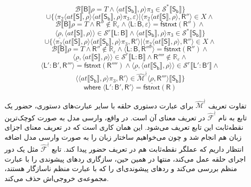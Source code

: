 $$\mathcal{B}\llbracket \mathsf{B} \rrbracket \rho = \mathit{T}\land \langle at \llbracket \mathsf{S_b} \rrbracket , \rho \rangle \pi_3 \in \mathcal{S}^* \llbracket \mathsf{S_b} \rrbracket \}$$
$$\cup\{\langle \pi_2 \langle at \llbracket \mathsf{S} \rrbracket , \rho \rangle \langle at \llbracket \mathsf{S_b} \rrbracket , \rho \rangle \pi_3 , \varepsilon \rangle | \langle \pi_2 \langle at \llbracket \mathsf{S} \rrbracket , \rho \rangle , \mathsf{R''} \rangle \in X \land$$
$$\mathcal{B} \llbracket \mathsf{B} \rrbracket \rho = \mathit{T} \land \mathsf{R''} \notin \mathbb{R_\varepsilon} \land \langle \mathsf{L:B} , \varepsilon \rangle = \mathsf{fstnxt(R'')} \land$$	
$$\langle \underline{\rho} ,\langle at \llbracket \mathsf{S} \rrbracket, \rho \rangle \rangle \in \mathcal{S}^r \llbracket \mathsf{L:B} \rrbracket \land \langle at \llbracket \mathsf{S_b} \rrbracket , \rho \rangle \pi_3 \in \mathcal{S}^* \llbracket \mathsf{S_b} \rrbracket\}$$ 
$$\cup \{ \langle \pi_2 \langle at \llbracket \mathsf{S} \rrbracket , \rho \rangle \langle at \llbracket \mathsf{S_b} \rrbracket , \rho \rangle \pi_3 , \mathsf{R'} \rangle | \langle \pi_2 \langle at \llbracket \mathsf{S} \rrbracket , \rho \rangle , \mathsf{R''} \rangle \in X \land$$
$$\mathcal{B} \llbracket \mathsf{B} \rrbracket \rho = \mathit{T} \land \mathsf{R''} \notin \mathbb{R_\varepsilon} \land \langle \mathsf{L:B,R''''} \rangle = \mathsf{fstnxt(R'')} \land$$
$$\langle \underline{\rho} , \langle at \llbracket \mathsf{S}\rrbracket , \rho \rangle \rangle \in \mathcal{S}^r \llbracket \mathsf{L:B} \rrbracket \land \mathsf{R''''} \notin \mathbb{R_\varepsilon} \land$$
$$\langle \mathsf{L':B',R'''} \rangle = \mathsf{fstnxt(R'''')} \land \langle \underline{\rho} , \langle at \llbracket \mathsf{S_b}\rrbracket , \rho \rangle \rangle \in \mathcal{S}^r \llbracket \mathsf{L':B'} \rrbracket \land$$
$$\langle \langle at \llbracket \mathsf{S_b} \rrbracket, \rho \rangle \pi_3 , \mathsf{R'} \rangle \in \mathcal{\hat{M}^\nmid} \langle \underline{\rho} , \mathsf{R'''} \rangle \llbracket \mathsf{S_b} \rrbracket \}$$
$$ \mathsf{where \; \langle L':B' , R' \rangle = fstnxt(R)}$$

تفاوت تعریف 
$\mathcal{\hat{M}}^\nmid$
 برای عبارت‌ دستوری حلقه با سایر عبارت‌های دستوری، حضور یک تابع به نام $\mathcal{\hat{F}^\nmid}$ در تعریف معنای آن است. در واقع، وارسی مدل به صورت کوچک‌ترین نقطه‌ثابت این تابع تعریف می‌شود. این همان کاری است که در تعریف معنای اجزای زبان هم انجام شد و چون می‌خواهیم ساختار زبان را به صورت وارسی مدل اضافه انتظار داریم که عملگر نقطه‌ثابت هم در تعریف حضور پیدا کند. تابع $\mathcal{\hat{F}^\nmid}$ مثل یک دور اجرای حلقه‌ عمل می‌کند، منتها در همین حین، سازگاری ردهای پیشوندی را با عبارت منظم بررسی می‌کند و ردهای پیشوندی‌ای را که با عبارت منظم ناسازگار هستند، مجموعه‌ی خروجی‌اش حذف می‌کند.


